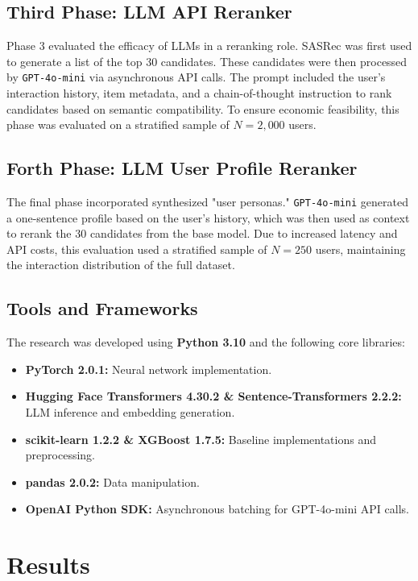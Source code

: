 \documentclass[conference]{IEEEtran}
\begin{document}
\subsection{Third Phase: LLM API Reranker}

Phase 3 evaluated the efficacy of LLMs in a reranking role. SASRec was first used to generate a list of the top 30 candidates. These candidates were then processed by \texttt{GPT-4o-mini} via asynchronous API calls. The prompt included the user’s interaction history, item metadata, and a chain-of-thought instruction to rank candidates based on semantic compatibility. To ensure economic feasibility, this phase was evaluated on a stratified sample of $N=2,000$ users.

\subsection{Forth Phase: LLM User Profile Reranker}

The final phase incorporated synthesized "user personas." \texttt{GPT-4o-mini} generated a one-sentence profile based on the user's history, which was then used as context to rerank the 30 candidates from the base model. Due to increased latency and API costs, this evaluation used a stratified sample of $N=250$ users, maintaining the interaction distribution of the full dataset.


\subsection{Tools and Frameworks}

The research was developed using \textbf{Python 3.10} and the following core libraries:
\begin{itemize}
    \item \textbf{PyTorch 2.0.1:} Neural network implementation.
    \item \textbf{Hugging Face Transformers 4.30.2 \& Sentence-Transformers 2.2.2:} LLM inference and embedding generation.
    \item \textbf{scikit-learn 1.2.2 \& XGBoost 1.7.5:} Baseline implementations and preprocessing.
    \item \textbf{pandas 2.0.2:} Data manipulation.
    \item \textbf{OpenAI Python SDK:} Asynchronous batching for GPT-4o-mini API calls.
\end{itemize}

\section{Results}
\end{document}

